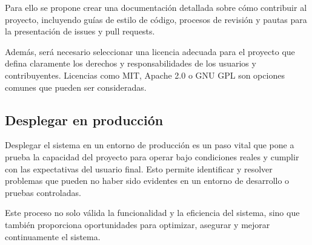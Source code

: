 Para ello se propone crear una documentación detallada sobre cómo contribuir al proyecto, incluyendo guías de estilo
de código, procesos de revisión y pautas para la presentación de issues y pull requests.

Además, será necesario seleccionar una licencia adecuada para el proyecto que defina claramente los derechos y
responsabilidades de los usuarios y contribuyentes.
Licencias como MIT, Apache 2.0 o GNU GPL son opciones comunes que pueden ser consideradas.

\subsection*{Desplegar en producción}

Desplegar el sistema en un entorno de producción es un paso vital que pone a prueba la capacidad del proyecto para
operar bajo condiciones reales y cumplir con las expectativas del usuario final.
Esto permite identificar y resolver problemas que pueden no haber sido evidentes en un entorno de desarrollo o
pruebas controladas.

Este proceso no solo válida la funcionalidad y la eficiencia del sistema, sino que también proporciona oportunidades
para optimizar, asegurar y mejorar continuamente el sistema.